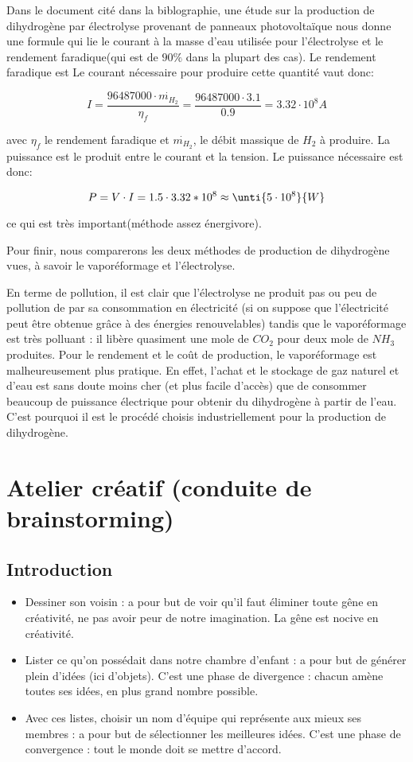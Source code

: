 Dans le document cité dans la biblographie, une étude sur la production
de dihydrogène par électrolyse provenant de panneaux photovoltaïque nous
donne une formule qui lie le courant à la masse d'eau utilisée pour
l'électrolyse et le rendement faradique(qui est de $90\%$ dans la plupart des cas).
Le rendement faradique est Le courant nécessaire pour produire cette quantité vaut donc:

$$I = \frac{96487000\cdot {\dot{m_{H_{2}}}}}{\eta_{f}} = \frac{96487000\cdot 3.1}{0.9} =  \unit{3.32\cdot 10^{8}}{A}$$

avec $\eta_{f}$ le rendement faradique et $\dot{m_{H_{2}}}$, le débit massique
de $H_{2}$ à produire. La puissance est le produit entre le courant et la 
tension. Le puissance nécessaire est donc:

$$P = V\cdot I = 1.5\cdot 3.32*10^{8} \approx \unti{5\cdot 10^{8}}{W}$$

ce qui est très important(méthode assez énergivore).

Pour finir, nous comparerons les deux méthodes de production de 
dihydrogène vues, à savoir le vaporéformage et l'électrolyse.

En terme de pollution, il est clair que l'électrolyse ne produit 
pas ou peu de pollution de par sa consommation en électricité 
(si on suppose que l'électricité peut être obtenue grâce à des énergies renouvelables)
tandis que le vaporéformage est très polluant : il libère quasiment une mole de $CO_{2}$
pour deux mole de $NH_{3}$ produites. Pour le rendement et le coût de production, 
le vaporéformage est malheureusement plus pratique. En effet, l'achat et le stockage
de gaz naturel et d'eau est sans doute moins cher (et plus facile d'accès) que 
de consommer beaucoup de puissance électrique pour obtenir du dihydrogène à partir
de l'eau. C'est pourquoi il est le procédé choisis industriellement pour la production
de dihydrogène.

\section{Atelier créatif (conduite de brainstorming)}
\subsection{Introduction}
\begin{itemize}
\item Dessiner son voisin : a pour but de voir qu'il faut éliminer toute gêne en créativité, ne pas avoir peur de notre imagination. La gêne est nocive en créativité.
\item Lister ce qu'on possédait dans notre chambre d'enfant : a pour but de générer plein d'idées (ici d'objets). C'est une phase de divergence : chacun amène toutes ses idées, en plus grand nombre possible.
\item Avec ces listes, choisir un nom d'équipe qui représente aux mieux ses membres : a pour but de sélectionner les meilleures idées. C'est une phase de convergence : tout le monde doit se mettre d'accord.
\end{itemize}

